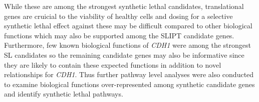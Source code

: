 While these are among the strongest synthetic lethal candidates, translational genes are cruicial to the viability of healthy cells and dosing for a selective synthetic lethal effect against these may be difficult compared to other biological functions which may also be supported among the \gls{SLIPT} candidate genes. Furthermore, few known biological functions of \textit{CDH1} were among the strongest SL candidates so the remaining candidate genes may also be informative since they are likely to contain these expected functions in addition to novel relationships for \textit{CDH1}. Thus further pathway level analyses were also conducted to examine biological functions over-represent\-ed among synthetic candidate genes and identify synthetic lethal pathways.

\begin{table}[!ht]
\caption{Candidate synthetic lethal gene partners of \textit{CDH1} from SLIPT}
\label{tab:gene_SL}
\centering
{}
\end{table}
